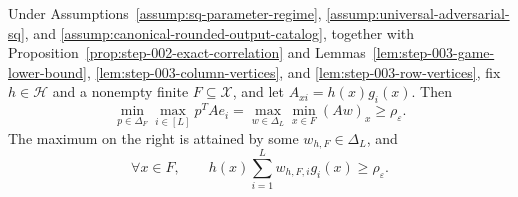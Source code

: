 \begin{proposition}
\label{prop:step-003-finite-separator}
Under Assumptions~\ref{assump:sq-parameter-regime},
\ref{assump:universal-adversarial-sq}, and
\ref{assump:canonical-rounded-output-catalog}, together with
Proposition~\ref{prop:step-002-exact-correlation} and
Lemmas~\ref{lem:step-003-game-lower-bound},
\ref{lem:step-003-column-vertices}, and
\ref{lem:step-003-row-vertices}, fix \(h\in\mathcal H\) and a nonempty
finite \(F\subseteq\mathcal X\), and let
\(A_{xi}=h(x)g_i(x)\).  Then
\begin{equation}
\min_{p\in\Delta_F}\max_{i\in[L]}p^{T}Ae_i
=\max_{w\in\Delta_L}\min_{x\in F}(Aw)_x
\ge\rho_{\varepsilon}.
\label{eq:step-003-minimax-separator}
\end{equation}
The maximum on the right is attained by some
\(w_{h,F}\in\Delta_L\), and
\begin{equation}
\forall x\in F,
\qquad
h(x)\sum_{i=1}^Lw_{h,F,i}g_i(x)
\ge\rho_{\varepsilon}.
\label{eq:step-003-finite-margin}
\end{equation}
\end{proposition}

